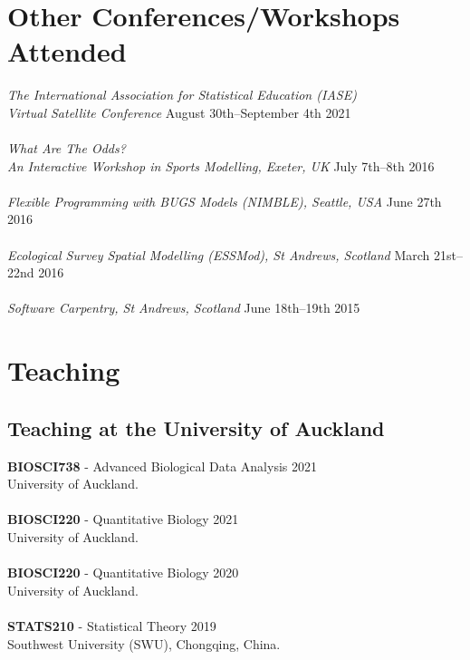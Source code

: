 \documentclass[10pt,letter]{article}
\begin{document}
  
\section*{Other Conferences/Workshops Attended}
\vspace{1mm}
{\sl The International Association for Statistical Education (IASE) \\ Virtual Satellite Conference} \hfill August 30th--September 4th 2021\\
\hdashrule[0.5ex]{4cm}{1pt}{1pt}\\
{\sl What Are The Odds? \\ An Interactive Workshop in Sports Modelling, Exeter, UK} \hfill July 7th--8th 2016\\
\hdashrule[0.5ex]{4cm}{1pt}{1pt}\\
{\sl Flexible Programming with BUGS Models (NIMBLE), Seattle, USA} \hfill June 27th 2016\\
\hdashrule[0.5ex]{4cm}{1pt}{1pt}\\
{\sl Ecological Survey Spatial Modelling (ESSMod), St Andrews, Scotland} \hfill March 21st--22nd 2016\\
 \hdashrule[0.5ex]{4cm}{1pt}{1pt}\\
 {\sl Software Carpentry, St Andrews, Scotland} \hfill June 18th--19th 2015\\
 \newpage
 \section*{Teaching}
\vspace{1mm}
 \subsection*{Teaching at the University of Auckland}
 \vspace{1mm}
 \textbf{BIOSCI738} - Advanced Biological Data Analysis \hfill{2021} \\
 University of Auckland.\\
\hdashrule[0.5ex]{4cm}{1pt}{1pt}\\
 \textbf{BIOSCI220} - Quantitative Biology \hfill{2021} \\
 University of Auckland.\\
\hdashrule[0.5ex]{4cm}{1pt}{1pt}\\
 \textbf{BIOSCI220} - Quantitative Biology \hfill{2020} \\
 University of Auckland.\\
\hdashrule[0.5ex]{4cm}{1pt}{1pt}\\
 \textbf{STATS210} - Statistical Theory \hfill{2019} \\
 Southwest University (SWU), Chongqing, China.
 
\end{document}
